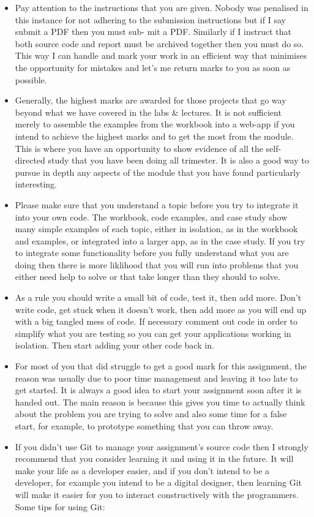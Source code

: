 \documentclass[letterpaper,11pt]{texMemo}
\begin{document}
\begin{itemize}
\item Pay attention to the instructions that you are given. Nobody was penalised in this instance for not adhering to the submission instructions but if I say submit a PDF then you must sub- mit a PDF. Similarly if I instruct that both source code and report must be archived together then you must do so. This way I can handle and mark your work in an efficient way that minimises the opportunity for mistakes and let’s me return marks to you as soon as possible.
\item Generally, the highest marks are awarded for those projects that go way beyond what we have covered in the labs \& lectures. It is not sufficient merely to assemble the examples from the workbook into a web-app if you intend to achieve the highest marks and to get the most from the module. This is where you have an opportunity to show evidence of all the self-directed study that you have been doing all trimester. It is also a good way to pursue in depth any aspects of the module that you have found particularly interesting.
\item Please make sure that you understand a topic before you try to integrate it into your own code. The workbook, code examples, and case study show many simple examples of each topic, either in isolation, as in the workbook and examples, or integrated into a larger app, as in the case study. If you try to integrate some functionality before you fully understand what you are doing then there is more liklihood that you will run into problems that you either need help to solve or that take longer than they should to solve.
\item As a rule you should write a small bit of code, test it, then add more. Don’t write code, get stuck when it doesn’t work, then add more as you will end up with a big tangled mess of code. If necessary comment out code in order to simplify what you are testing so you can get your applications working in isolation. Then start adding your other code back in.
\item For most of you that did struggle to get a good mark for this assignment, the reason was usually due to poor time management and leaving it too late to get started. It is always a good idea to start your assignment soon after it is handed out. The main reason is because this gives you time to actually think about the problem you are trying to solve and also some time for a false start, for example, to prototype something that you can throw away.
\item If you didn’t use Git to manage your assignment's source code then I strongly recommend that you consider learning it and using it in the future. It will make your life as a developer easier, and if you don’t intend to be a developer, for example you intend to be a digital designer, then learning Git will make it easier for you to interact constructively with the programmers. Some tips for using Git:


\end{itemize}
\end{document}
